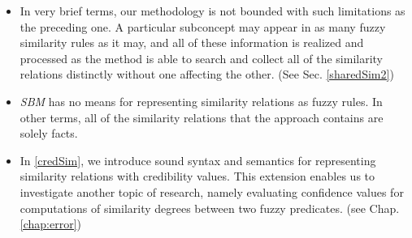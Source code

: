 \documentclass[egilmezThesis.tex]{subfiles}
\begin{document}
\renewcommand{\labelitemi}{$\diamond$}
\begin{itemize}
\item In very brief terms, our methodology is not bounded with such limitations as the preceding one. A particular subconcept may appear in as many fuzzy similarity rules as it may, and all of these information is realized and processed as the method is able to search and collect all of the similarity relations distinctly without one affecting the other. (See Sec. \ref{sharedSim2})

\end{itemize}
\renewcommand{\labelitemi}{$\bullet$}
\begin{itemize}
\item \textit{SBM} has no means for representing similarity relations as fuzzy rules. In other terms, all of the similarity relations that the approach contains are solely facts.
\end{itemize}
\renewcommand{\labelitemi}{$\diamond$}
\begin{itemize}
\item In \ref{credSim}, we introduce sound syntax and semantics for representing similarity relations with credibility values. This extension enables us to investigate another topic of research, namely evaluating confidence values for computations of similarity degrees between two fuzzy predicates. (see Chap. \ref{chap:error})
\end{itemize}
\end{document}
